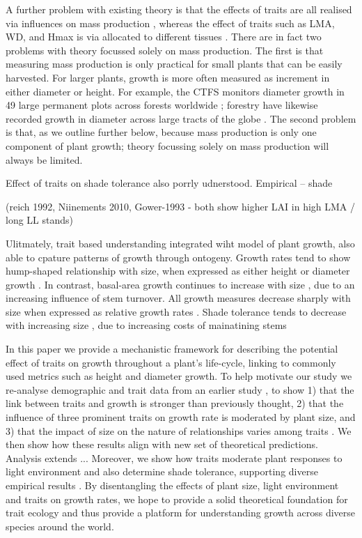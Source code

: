 \documentclass[12pt, a4paper]{article}
\begin{document}
A further problem with existing theory is that the effects of traits are all
realised via influences on mass production \citep{enquist-2007},
whereas the effect of traits such as LMA, WD, and Hmax is via allocated
to different tissues \citep{falster-2011}. There are in fact two problems with theory
focussed solely on mass production. The first is that measuring mass
production is only practical for small plants that can be easily harvested.
For larger plants, growth is more often measured as increment in either diameter
or height. For example, the CTFS monitors diameter growth in 49 large permanent
plots across forests worldwide \citep{anderson-teixeira-2015};
 forestry have likewise recorded growth in diameter across
large tracts of the globe \citep{purves-2008}. The second problem is
that, as we outline further below, because mass production is only one
component of plant growth; theory focussing solely on mass production will
 always be limited.

Effect of traits on shade tolerance also porrly udnerstood. Empirical -- shade

(reich 1992, Niinements 2010, Gower-1993 - both show higher LAI in high LMA / long LL stands)

Ulitmately, trait based understanding integrated wiht model of plant growth, also able to cpature patterns of growth through ontogeny. Growth rates tend to show hump-shaped relationship with size, when expressed as either height \citep{sillett-2010, king-2011} or diameter growth \citep{herault-2011}.  In contrast, basal-area growth continues to increase with size \citep{sillett-2010, stephenson-2014}, due to an increasing influence of stem turnover. All growth measures decrease sharply with size when expressed as relative growth rates \citep{rees-2010, iida-2014}. Shade tolerance tends to decrease with increasing size \citep{lusk-2006}, due to increasing costs of mainatining stems \citep{givnish-1988}

In this paper we provide a mechanistic framework for describing the potential
effect of traits on growth throughout a plant's life-cycle, linking to
commonly used metrics such as height and diameter growth. To help motivate our
study we re-analyse demographic and trait data from an earlier study
 \citep{wright-2010}, to show 1) that the link between traits and
growth is stronger than previously thought, 2) that the influence of three
prominent traits on growth rate is moderated by plant size, and 3) that the
impact of size on the nature of relationships varies among traits
 \citep[see also]{ruger-2012}. We then show how these results align with new
set of theoretical predictions. Analysis extends ...
Moreover, we show how traits moderate plant
responses to light environment and also determine shade tolerance, supporting
diverse empirical results \citep{ruger-2012, poorter-2006}. By
disentangling the effects of plant size, light environment and traits on
growth rates, we hope to provide a solid theoretical foundation for trait
ecology and thus provide a platform for understanding growth across diverse
species around the world.
\end{document}
